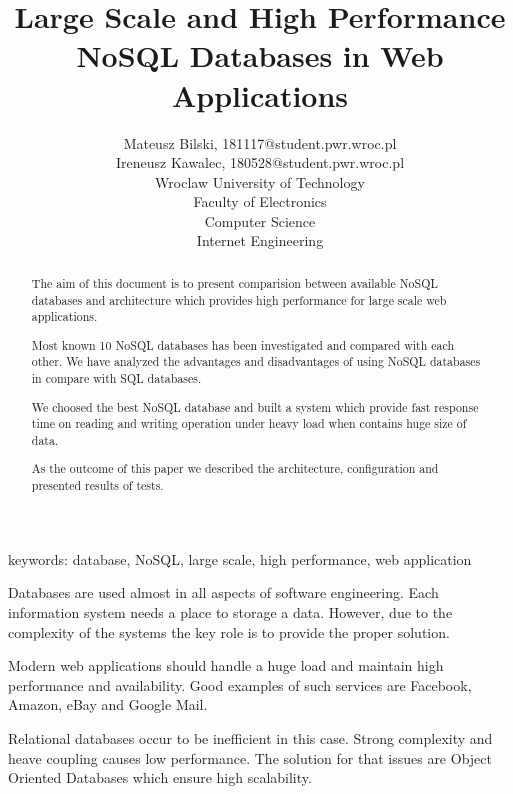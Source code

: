 \documentclass[times, 10pt,twocolumn]{article}
\begin{document}
 

\title{ Large Scale and High Performance NoSQL Databases in Web Applications}
\author{Mateusz Bilski, 181117@student.pwr.wroc.pl \\ Ireneusz Kawalec, 180528@student.pwr.wroc.pl \\ 
Wroclaw University of Technology\\ Faculty of Electronics \\ Computer Science \\ Internet Engineering  \\  
} 

\maketitle
\thispagestyle{empty} 

\begin{abstract}  

The aim of this document is to present comparision between available NoSQL databases and architecture which
provides high performance for large scale web applications.

Most known 10 NoSQL databases has been investigated and compared with each other. We have analyzed the advantages 
and disadvantages of using NoSQL databases in compare with SQL databases. 

We choosed the best NoSQL database and built a system which provide fast response time on reading and writing operation
under heavy load when contains huge size of data.

As the outcome of this paper we described the architecture, configuration and presented results of tests.

\end{abstract} 

keywords: database, NoSQL, large scale, high performance, web application


Databases are used almost in all aspects of software engineering. Each 
information system needs a place to storage a data. However, due to the complexity of the systems 
the key role is to provide the proper solution.

Modern web applications should handle a huge load and maintain high performance and
availability. Good examples of such services are Facebook, Amazon, eBay and Google Mail.

Relational databases occur to be inefficient in this case. Strong complexity and
heave coupling causes low performance. The solution for that issues are Object Oriented
Databases which ensure high scalability.
\end{document}
